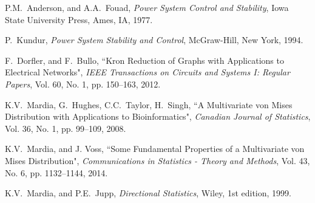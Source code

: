 \documentclass[10pt,twocolumn]{IEEEtran}
\begin{document}
\begin{thebibliography}{99}

P.M.~Anderson, and A.A.~Fouad, \emph{Power System Control and Stability}, Iowa State University Press, Ames, IA, 1977.

P.~Kundur, \emph{Power System Stability and Control}, McGraw-Hill, New York, 1994.


F.~Dorfler, and F.~Bullo, ``Kron Reduction of Graphs with Applications to Electrical Networks", \emph{IEEE Transactions on Circuits and Systems I: Regular Papers}, Vol. 60, No. 1, pp. 150--163, 2012.

K.V.~Mardia, G.~Hughes, C.C.~Taylor, H.~Singh, ``A Multivariate von Mises Distribution with Applications to Bioinformatics", \emph{Canadian Journal of Statistics}, Vol. 36, No. 1, pp. 99--109, 2008.

K.V.~Mardia, and J. Voss, ``Some Fundamental Properties of a
Multivariate von Mises Distribution", \emph{Communications in Statistics - Theory and Methods}, Vol. 43, No. 6, pp. 1132--1144, 2014.

K.V.~Mardia, and P.E.~Jupp, \emph{Directional Statistics}, Wiley, 1st edition, 1999.

	
\end{thebibliography}


\end{document}
